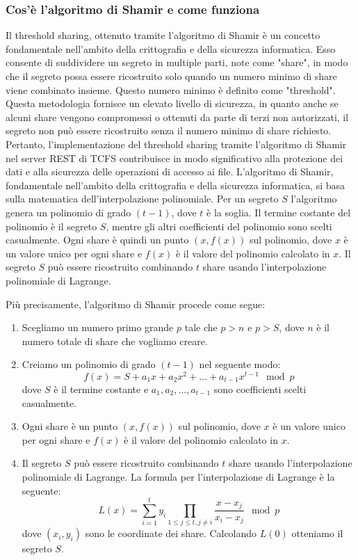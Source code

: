 \subsubsection{Cos'è l'algoritmo di Shamir e come funziona}
Il threshold sharing, ottenuto tramite l'algoritmo di Shamir è un concetto fondamentale nell'ambito della crittografia e della sicurezza informatica. Esso consente di suddividere un segreto in multiple parti, note come "share", in modo che il segreto possa essere ricostruito solo quando un numero minimo di share viene combinato insieme. Questo numero minimo è definito come "threshold". Questa metodologia fornisce un elevato livello di sicurezza, in quanto anche se alcuni share vengono compromessi o ottenuti da parte di terzi non autorizzati, il segreto non può essere ricostruito senza il numero minimo di share richiesto. Pertanto, l'implementazione del threshold sharing tramite l'algoritmo di Shamir nel server REST di TCFS contribuisce in modo significativo alla protezione dei dati e alla sicurezza delle operazioni di accesso ai file.
L'algoritmo di Shamir, fondamentale nell'ambito della crittografia e della sicurezza informatica, si basa sulla matematica dell'interpolazione polinomiale. Per un segreto $S$ l'algoritmo genera un polinomio di grado $(t-1)$, dove $t$ è la soglia. Il termine costante del polinomio è il segreto $S$, mentre gli altri coefficienti del polinomio sono scelti casualmente. Ogni share è quindi un punto $(x, f(x))$ sul polinomio, dove $x$ è un valore unico per ogni share e $f(x)$ è il valore del polinomio calcolato in $x$. Il segreto $S$ può essere ricostruito combinando $t$ share usando l'interpolazione polinomiale di Lagrange.

Più precisamente, l'algoritmo di Shamir procede come segue:

\begin{enumerate}
    \item Scegliamo un numero primo grande $p$ tale che $p > n$ e $p > S$, dove $n$ è il numero totale di share che vogliamo creare.
    \item Creiamo un polinomio di grado $(t-1)$ nel seguente modo:
   \[f(x) = S + a_1x + a_2x^2 + \ldots + a_{t-1}x^{t-1} \mod p\]
   dove $S$ è il termine costante e $a_1, a_2, \ldots, a_{t-1}$ sono coefficienti scelti casualmente.
    \item Ogni share è un punto $(x, f(x))$ sul polinomio, dove $x$ è un valore unico per ogni share e $f(x)$ è il valore del polinomio calcolato in $x$.
    \item Il segreto $S$ può essere ricostruito combinando $t$ share usando l'interpolazione polinomiale di Lagrange. La formula per l'interpolazione di Lagrange è la seguente:
        \[L(x) = \sum_{i=1}^{t} y_i \prod_{1 \leq j \leq t, j \neq i} \frac{x - x_j}{x_i - x_j} \mod p\]
   dove $(x_i, y_i)$ sono le coordinate dei share. Calcolando $L(0)$ otteniamo il segreto $S$.
\end{enumerate}

